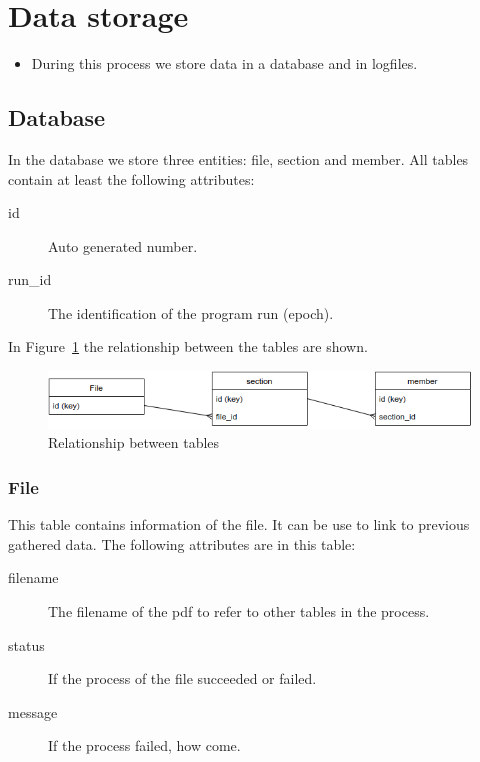 \documentclass{ou-report}
\begin{document}
\section{Data storage}
\begin{itemize}
    \item During this process we store data in a database and in logfiles.
\end{itemize}


\subsection{Database}
In the database we store three entities: file, section and member. All tables 
contain at least the following attributes:
\begin{description}
    \item[id] Auto generated number.
    \item[run\_id] The identification of the program run (epoch).
\end{description}
In Figure~\ref{fig:lncs_pdf_database} the relationship between the tables are
shown.
\begin{figure}[H]
    \centering
    \includegraphics[width=12cm]{images/lncs_pdf_parser_tool.drawio.png}
    \caption{Relationship between tables}
    \label{fig:lncs_pdf_database}
\end{figure}

\subsubsection{File}
This table contains information of the file. It can be use to link to previous 
gathered data. The following attributes are in this table:
\begin{description}
    \item[filename] The filename of the pdf to refer to other tables in the 
        process.
    \item[status] If the process of the file succeeded or failed.
    \item[message] If the process failed, how come. 
\end{description}
\end{document}
